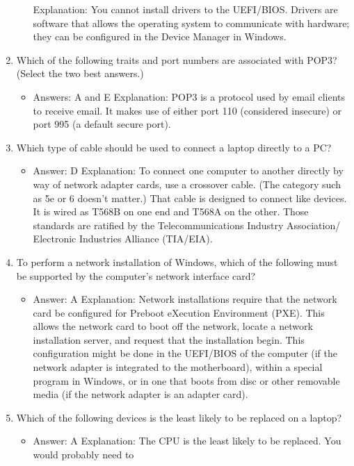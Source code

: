 \documentclass{article}
\begin{document}
\begin{enumerate}
\begin{itemize}
Explanation: You cannot install drivers to the UEFI/BIOS. Drivers are software that allows
the operating system to communicate with hardware; they can be configured in the
Device Manager in Windows.
    \end{itemize}
    \item Which of the following traits and port numbers are associated with
POP3? (Select the two best answers.)
    \begin{itemize}
        \item Answers: A and E
Explanation: POP3 is a protocol used by email clients to receive email. It makes use of
either port 110 (considered insecure) or port 995 (a default secure port).
    \end{itemize}
    \item Which type of cable should be used to connect a laptop directly to
a PC?
    \begin{itemize}
        \item Answer: D
Explanation: To connect one computer to another directly by way of network adapter
cards, use a crossover cable. (The category such as 5e or 6 doesn’t matter.) That cable
is designed to connect like devices. It is wired as T568B on one end and T568A on the
other. Those standards are ratified by the Telecommunications Industry Association/
Electronic Industries Alliance (TIA/EIA).
    \end{itemize}
    \item To perform a network installation of Windows, which of the following
must be supported by the computer’s network interface card?
    \begin{itemize}
        \item Answer: A
Explanation: Network installations require that the network card be configured for
Preboot eXecution Environment (PXE). This allows the network card to boot off the
network, locate a network installation server, and request that the installation begin.
This configuration might be done in the UEFI/BIOS of the computer (if the network
adapter is integrated to the motherboard), within a special program in Windows, or
in one that boots from disc or other removable media (if the network adapter is an
adapter card).
    \end{itemize}
    \item Which of the following devices is the least likely to be replaced on
a laptop?
    \begin{itemize}
        \item Answer: A
Explanation: The CPU is the least likely to be replaced. You would probably need to

\end{itemize}
\end{enumerate}
\end{document}
